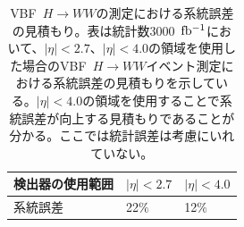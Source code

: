 \begin{table}[bpt]
\begin{center}
\caption[VBF~$H\rightarrow WW$の測定における系統誤差の見積もり]{VBF~$H\rightarrow WW$の測定における系統誤差の見積もり。表は統計数3000~$\rm{fb^{-1}}$において、$|\eta| <2.7$、$|\eta| <4.0$の領域を使用した場合のVBF~$H\rightarrow WW$イベント測定における系統誤差の見積もりを示している。$|\eta| <4.0$の領域を使用することで系統誤差が向上する見積もりであることが分かる。ここでは統計誤差は考慮にいれていない。}
\label{VBF_uncertainty}
  \begin{tabular}{|lll|} \hline
    検出器の使用範囲 & $|\eta| <2.7 $ & $|\eta| < 4.0 $ \\ \hline
    系統誤差 & 22$\%$ & 12$\%$ \\ \hline
  \end{tabular}
\end{center}
\end{table}

